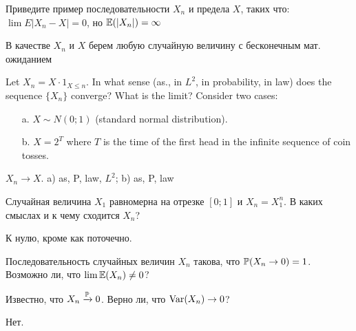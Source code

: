 \begin{solution}
\begin{solution}
\begin{solution}
\begin{solution}
\begin{solution}
\end{solution}

\begin{problem}
Приведите пример последовательности $X_{n}$ и предела $X$, таких что: $\lim E|X_{n}-X|=0$, но $\E(|X_{n}|)=\infty$ 
\end{problem} 
\begin{solution} 
 В качестве $X_{n}$ и $ X $ берем любую случайную величину с бесконечным мат. ожиданием
\end{solution}

\begin{problem}
Let $X_{n}=X\cdot 1_{X\leq n}$. In what sense (as., in $L^{2}$, in probability, in law) does the sequence $ \{X_{n}\} $ converge? What is the limit? Consider two cases:
\begin{itemize}
\item[a.] $ X\sim N(0;1) $ (standard normal distribution).
\item[b.] $ X =2^{T}$ where $T$ is the time of the first head in the infinite sequence of coin tosses.
\end{itemize}

\end{problem} 
\begin{solution} 
 $ X_{n}\to X $. a) as, P, law, $ L^{2} $; b) as, P, law 
\end{solution}

\begin{problem}
Случайная величина $X_1$ равномерна на отрезке $[0;1]$ и $X_n=X_1^n$. В каких смыслах и к чему сходится $X_n$?
\end{problem} 
\begin{solution} 
К нулю, кроме как поточечно.
\end{solution}

\begin{problem}
Последовательность случайных величин $X_n$ такова, что $\P(X_n\to 0)=1$. Возможно ли, что $\lim \E(X_n)\neq 0$?
\end{problem} 
\begin{solution} 

\end{solution}

\begin{problem}
Известно, что $X_n \xrightarrow{\P} 0$. Верно ли, что $\Var(X_n)\to 0$? 
\end{problem} 
\begin{solution} 
Нет.
\end{solution}


\end{solution}
\end{solution}
\end{solution}
\end{solution}
